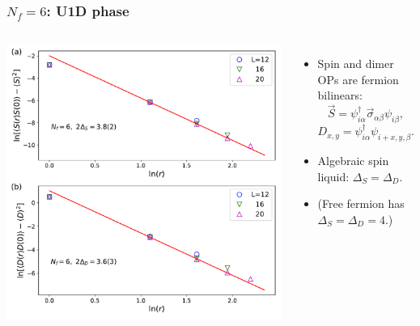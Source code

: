 \documentclass[xcolor=table, 10pt, aspectratio=43]{beamer}
\begin{document}
\begin{frame}
  \frametitle{$N_f=6$: U1D phase}
  \begin{columns}
    \includegraphics[width=\textwidth]{../u1sl/n6decay}
		\begin{itemize}
			\item Spin and dimer OPs are fermion bilinears:
			\[\vec S = \psi^\dagger_{i\alpha}\vec\sigma_{\alpha\beta}\psi_{i\beta},\]
			\[D_{x,y} = \psi^\dagger_{i\alpha}\psi_{i+x,y,\beta}.\]
			\item Algebraic spin liquid: $\Delta_S = \Delta_D$.
		  \item (Free fermion has $\Delta_S=\Delta_D = 4$.)
		\end{itemize}
  \end{columns}
\end{frame}
\end{document}
